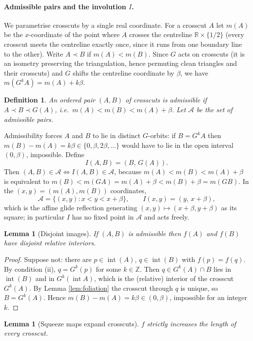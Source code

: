 \documentclass[12pt]{article}
\newtheorem{lemma}[theorem]{Lemma}
\newtheorem{definition}[theorem]{Definition}
\newcommand{\R}{\mathbb{R}}
\newcommand{\Z}{\mathbb{Z}}
\DeclareMathOperator{\interior}{int}
\begin{document}
\paragraph{Admissible pairs and the involution $I$.}
We parametrise crosscuts by a single real coordinate. For a crosscut $A$
let $m(A)$ be the $x$-coordinate of the point where $A$ crosses the
centreline $\R\times\{1/2\}$ (every crosscut meets the centreline
exactly once, since it runs from one boundary line to the other).
Write $A\prec B$ if $m(A)<m(B)$. Since $G$ acts on crosscuts (it is an
isometry preserving the triangulation, hence permuting clean triangles
and their crosscuts) and $G$ shifts the centreline coordinate by $\beta$,
we have $m(G^kA)=m(A)+k\beta$.

\begin{definition}
An ordered pair $(A,B)$ of crosscuts is \emph{admissible} if
$A\prec B\prec G(A)$, i.e.\ $m(A)<m(B)<m(A)+\beta$. Let $\mathcal A$ be
the set of admissible pairs.
\end{definition}

Admissibility forces $A$ and $B$ to lie in distinct $G$-orbits: if
$B=G^kA$ then $m(B)-m(A)=k\beta\in\{0,\beta,2\beta,\dots\}$ would have to
lie in the open interval $(0,\beta)$, impossible. Define
\[
I(A,B)=(B,\,G(A)).
\]
Then $(A,B)\in\mathcal A\iff I(A,B)\in\mathcal A$, because
$m(A)<m(B)<m(A)+\beta$ is equivalent to
$m(B)<m(GA)=m(A)+\beta<m(B)+\beta=m(GB)$. In the $(x,y)=(m(A),m(B))$
coordinates,
\[
\mathcal A=\{(x,y):x<y<x+\beta\},\qquad I(x,y)=(y,\,x+\beta),
\]
which is the affine glide reflection generating
$(x,y)\mapsto(x+\beta,y+\beta)$ as its square; in particular $I$ has no
fixed point in $\mathcal A$ and acts freely.

\begin{lemma}[Disjoint images]\label{lem:adm}
If $(A,B)$ is admissible then $f(A)$ and $f(B)$ have disjoint relative
interiors.
\end{lemma}

\begin{proof}
Suppose not: there are $p\in\interior(A)$, $q\in\interior(B)$ with
$f(p)=f(q)$. By condition (ii), $q=G^k(p)$ for some $k\in\Z$. Then
$q\in G^k(A)\cap B$ lies in $\interior(B)$ and in $G^k(\interior A)$,
which is the (relative) interior of the crosscut $G^k(A)$. By Lemma
\ref{lem:foliation} the crosscut through $q$ is unique, so $B=G^k(A)$.
Hence $m(B)-m(A)=k\beta\in(0,\beta)$, impossible for an integer $k$.
\end{proof}

\begin{lemma}[Squeeze maps expand crosscuts]\label{lem:expand}
$f$ strictly increases the length of every crosscut.
\end{lemma}
\end{document}
